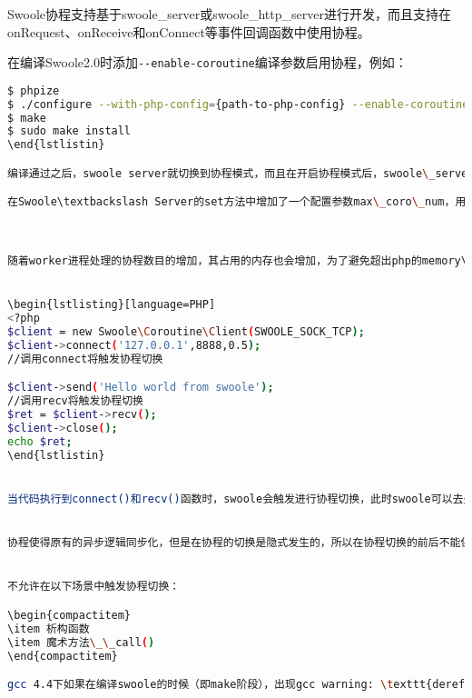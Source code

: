 Swoole协程支持基于swoole\_server或swoole\_http\_server进行开发，而且支持在onRequest、onReceive和onConnect等事件回调函数中使用协程。

在编译Swoole2.0时添加\texttt{-\/-enable-coroutine}编译参数启用协程，例如：

\begin{lstlisting}[language=bash]
$ phpize
$ ./configure --with-php-config={path-to-php-config} --enable-coroutine
$ make
$ sudo make install
\end{lstlistin}

编译通过之后，swoole server就切换到协程模式，而且在开启协程模式后，swoole\_server和swoole\_http\_server会为每一个请求创建对应的协程，可以在onRequest、onReceive和onConnect等事件回调中使用协程客户端。

在Swoole\textbackslash Server的set方法中增加了一个配置参数max\_coro\_num，用于配置一个worker进程最多同时处理的协程数目。



随着worker进程处理的协程数目的增加，其占用的内存也会增加，为了避免超出php的memory\_limit限制，可以根据实际业务的压测结果设置max\_coro\_num，默认为3000。


\begin{lstlisting}[language=PHP]
<?php
$client = new Swoole\Coroutine\Client(SWOOLE_SOCK_TCP);
$client->connect('127.0.0.1',8888,0.5);
//调用connect将触发协程切换

$client->send('Hello world from swoole');
//调用recv将触发协程切换
$ret = $client->recv();
$client->close();
echo $ret;
\end{lstlistin}


当代码执行到connect()和recv()函数时，swoole会触发进行协程切换，此时swoole可以去处理其他的事件或者接受新的请求。当此client连接成功或者后端服务回包后，swoole server会恢复协程上下文，代码逻辑继续从切换点开始恢复执行。开发者整个过程不需要关心整个切换过程。


协程使得原有的异步逻辑同步化，但是在协程的切换是隐式发生的，所以在协程切换的前后不能保证全局变量以及static变量的一致性。


不允许在以下场景中触发协程切换：

\begin{compactitem}
\item 析构函数
\item 魔术方法\_\_call()
\end{compactitem}

gcc 4.4下如果在编译swoole的时候（即make阶段），出现gcc warning: \texttt{dereferencing pointer ‘v.327’ does break strict-aliasing rules, dereferencing type-punned pointer will break strict-aliasing rules}，需要手动编辑Makefile，将\texttt{CFLAGS = -Wall -pthread -g -O2}替换为\texttt{CFLAGS = -Wall -pthread -g -O2 -fno-strict-aliasing}，然后重新编译Swoole。



\end{lstlisting}
